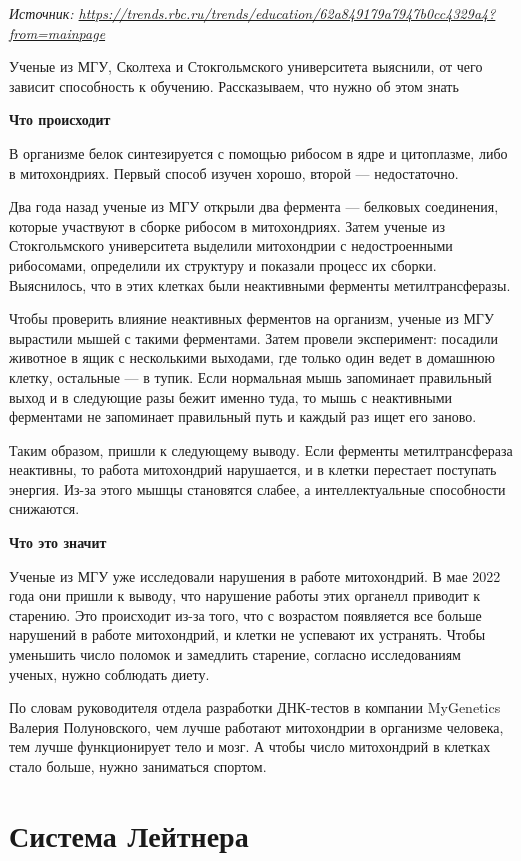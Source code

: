 \textit{Источник: \url{https://trends.rbc.ru/trends/education/62a849179a7947b0cc4329a4?from=mainpage}}

Ученые из МГУ, Сколтеха и Стокгольмского университета выяснили, от чего зависит способность к обучению. Рассказываем, что нужно об этом знать

\textbf{Что происходит}

В организме белок синтезируется с помощью рибосом в ядре и цитоплазме, либо в митохондриях. Первый способ изучен хорошо, второй --- недостаточно.

Два года назад ученые из МГУ открыли два фермента --- белковых соединения, которые участвуют в сборке рибосом в митохондриях. Затем ученые из Стокгольмского университета выделили митохондрии с недостроенными рибосомами, определили их структуру и показали процесс их сборки. Выяснилось, что в этих клетках были неактивными ферменты метилтрансферазы.

Чтобы проверить влияние неактивных ферментов на организм, ученые из МГУ вырастили мышей с такими ферментами. Затем провели эксперимент: посадили животное в ящик с несколькими выходами, где только один ведет в домашнюю клетку, остальные --- в тупик. Если нормальная мышь запоминает правильный выход и в следующие разы бежит именно туда, то мышь с неактивными ферментами не запоминает правильный путь и каждый раз ищет его заново.

Таким образом, пришли к следующему выводу. Если ферменты метилтрансфераза неактивны, то работа митохондрий нарушается, и в клетки перестает поступать энергия. Из-за этого мышцы становятся слабее, а интеллектуальные способности снижаются.

\textbf{Что это значит}

Ученые из МГУ уже исследовали нарушения в работе митохондрий. В мае 2022 года они пришли к выводу, что нарушение работы этих органелл приводит к старению. Это происходит из-за того, что с возрастом появляется все больше нарушений в работе митохондрий, и клетки не успевают их устранять. Чтобы уменьшить число поломок и замедлить старение, согласно исследованиям ученых, нужно соблюдать диету.

По словам руководителя отдела разработки ДНК-тестов в компании MyGenetics Валерия Полуновского, чем лучше работают митохондрии в организме человека, тем лучше функционирует тело и мозг. А чтобы число митохондрий в клетках стало больше, нужно заниматься спортом.

\clearpage
\section{Система Лейтнера}


